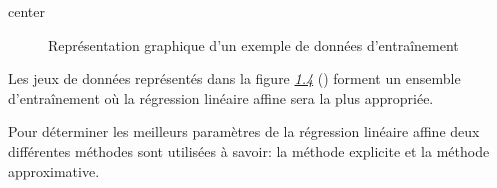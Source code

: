 \documentclass[letterpaper,11pt,english]{sphinxmanual}
\begin{document}
\begin{sphinxuseclass}{center}
\begin{figure}[H]
\centering
\capstart

\noindent{}
\caption{Représentation graphique d’un exemple de données d’entraînement}\label{\detokenize{chapter3:id7}}\end{figure}

\end{sphinxuseclass}
\begin{DUlineblock}{0em}
\item[] Les jeux de données représentés dans la figure {\hyperref[\detokenize{chapter3:exdonnee}]{\emph{1.4}}} ()
forment un ensemble d’entraînement où la régression linéaire affine
sera la plus appropriée.
\item[] Pour déterminer les meilleurs paramètres de la régression linéaire
affine deux différentes méthodes sont utilisées à savoir: la méthode
explicite et la méthode approximative.
\end{DUlineblock}
\end{document}
